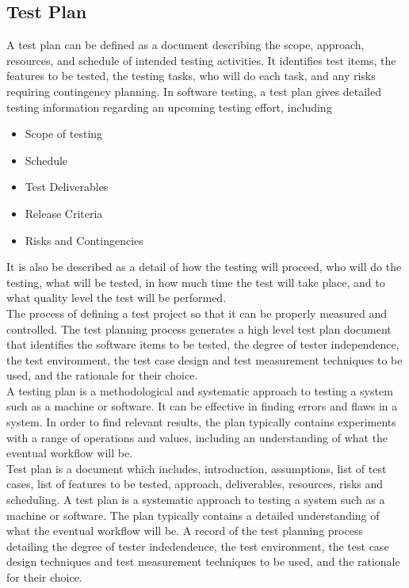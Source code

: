 \subsection{Test Plan}
A test plan can be defined as a document describing the scope, approach, resources, and schedule of intended testing activities. It identifies test items, the features to be tested, the testing tasks, who will do each task, and any risks requiring contingency planning.
In software testing, a test plan gives detailed testing information regarding an upcoming testing effort, including\\
\begin{itemize}
\item Scope of testing
\item Schedule
\item Test Deliverables
\item Release Criteria
\item Risks and Contingencies 
\end{itemize}
It is also be described as a detail of how the testing will proceed, who will do the testing, what will be tested, in how much time the test will take place, and to what quality level the test will be performed.\\

The process of defining a test project so that it can be properly measured and controlled. The test planning process generates a high level test plan document that identifies the software items to be tested, the degree of tester independence, the test environment, the test case design and test measurement techniques to be used, and the rationale for their choice.\\

A testing plan is a methodological and systematic approach to testing a system such as a machine or software. It can be effective in finding errors and flaws in a system. In order to find relevant results, the plan typically contains experiments with a range of operations and values, including an understanding of what the eventual workflow will be.\\

Test plan is a document which includes, introduction, assumptions, list of test cases, list of features to be tested, approach, deliverables, resources, risks and scheduling. A test plan is a systematic approach to testing a system such as a machine or software. The plan typically contains a detailed understanding of what the eventual workflow will be.
A record of the test planning process detailing the degree of tester indedendence, the test environment, the test case design techniques and test measurement techniques to be used, and the rationale for their choice.

